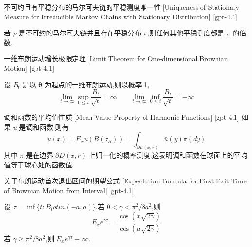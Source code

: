 \documentclass[UTF8]{ctexart}
\begin{document}
    
    
    \begin{thm}
        {不可约且有平稳分布的马尔可夫链的平稳测度唯一性}
        [Uniqueness of Stationary Measure for Irreducible Markov Chains with Stationary Distribution]
        [gpt-4.1]
        
若 $p$ 是不可约的马尔可夫链并且存在平稳分布 $\pi$,则任何其他平稳测度都是 $\pi$ 的倍数.

    \end{thm}
    
    
    
    \begin{thm}
        {一维布朗运动增长极限定理}
        [Limit Theorem for One-dimensional Brownian Motion]
        [gpt-4.1]
        
设 $B_{t}$ 是以 $\boldsymbol{\theta}$ 为起点的一维布朗运动,则以概率 1,
\[
\lim_{t \to \infty} \sup_{0 \leq t} \frac{B_{t}}{\sqrt{t}} = \infty \qquad \lim_{t \to \infty} \inf_{0 \leq t} \frac{B_{t}}{\sqrt{t}} = -\infty
\]

    \end{thm}
    
    
    
    \begin{ppt}
        {调和函数的平均值性质}
        [Mean Value Property of Harmonic Functions]
        [gpt-4.1]
        如果 $
u$ 是调和函数,则有
\[
u(x) = E_{x} 
u(B(\tau_{B})) = \int_{\partial D(x, r)} \bar{
u}(y) \pi(dy)
\]
其中 $\pi$ 是在边界 $\partial D(x, r)$ 上归一化的概率测度.这表明调和函数在球面上的平均值等于球心处的函数值.
    \end{ppt}
    
    
    
    \begin{thm}
        {关于布朗运动首次退出区间的期望公式}
        [Expectation Formula for First Exit Time of Brownian Motion from Interval]
        [gpt-4.1]
        
设 $\tau = \operatorname*{inf} \{ t : B _ { t } 
otin ( - a , a ) \}$.若 $0 < \gamma < \pi ^ { 2 } / 8 a ^ { 2 }$,则
\[
E _ { x } e ^ { \gamma \tau } = \frac { \cos ( x \sqrt { 2 \gamma } ) } { \cos ( a \sqrt { 2 \gamma } ) }
\]
若 $\gamma \geq \pi ^ { 2 } / 8 a ^ { 2 }$,则 $E _ { x } e ^ { \gamma \tau } \equiv \infty$.

    \end{thm}
    
\end{document}
